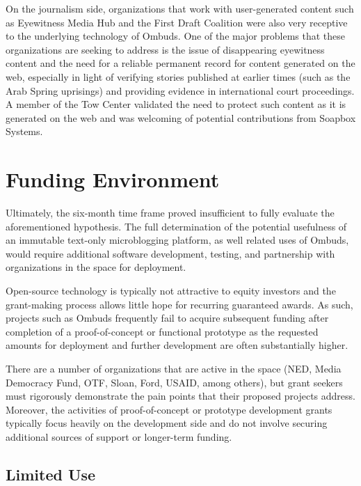 \documentclass[a4paper]{article}
\begin{document}
On the journalism side, organizations that work with user-generated content such as Eyewitness Media Hub and the First Draft Coalition were also very receptive to the underlying technology of Ombuds. One of the major problems that these organizations are seeking to address is the issue of disappearing eyewitness content and the need for a reliable permanent record for content generated on the web, especially in light of verifying stories published at earlier times (such as the Arab Spring uprisings) and providing evidence in international court proceedings. A member of the Tow Center validated the need to protect such content as it is generated on the web and was welcoming of potential contributions from Soapbox Systems.\par

\section{Funding Environment}

Ultimately, the six-month time frame proved insufficient to fully evaluate the aforementioned hypothesis. The full determination of the potential usefulness of an immutable text-only microblogging platform, as well related uses of Ombuds, would require additional software development, testing, and partnership with organizations in the space for deployment.\par

Open-source technology is typically not attractive to equity investors and the grant-making process allows little hope for recurring guaranteed awards. As such, projects such as Ombuds frequently fail to acquire subsequent funding after completion of a proof-of-concept or functional prototype as the requested amounts for deployment and further development are often substantially higher.\par

There are a number of organizations that are active in the space (NED, Media Democracy Fund, OTF, Sloan, Ford, USAID, among others), but grant seekers must rigorously demonstrate the pain points that their proposed projects address. Moreover, the activities of proof-of-concept or prototype development grants typically focus heavily on the development side and do not involve securing additional sources of support or longer-term funding.\par

\subsection{Limited Use}
\end{document}
